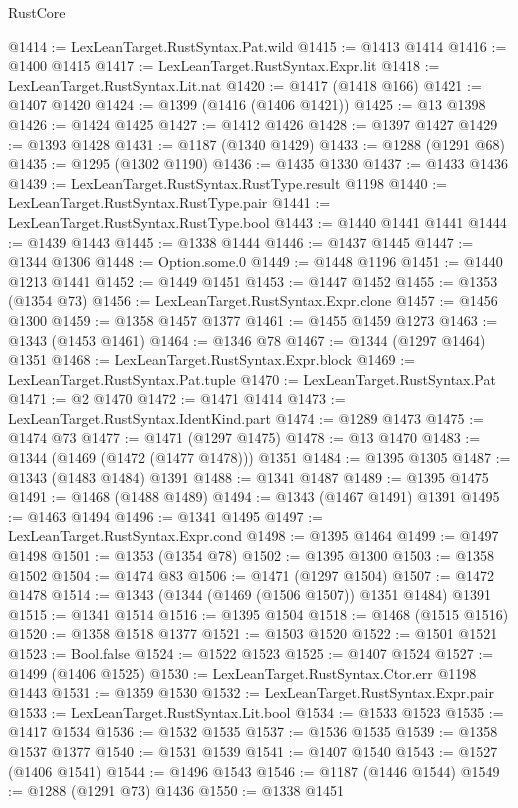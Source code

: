 \begin{lexlean}{RustCore}
\begin{coremodule}
@1414 := LexLeanTarget.RustSyntax.Pat.wild
@1415 := @1413 @1414
@1416 := @1400 @1415
@1417 := LexLeanTarget.RustSyntax.Expr.lit
@1418 := LexLeanTarget.RustSyntax.Lit.nat
@1420 := @1417 (@1418 @166)
@1421 := @1407 @1420
@1424 := @1399 (@1416 (@1406 @1421))
@1425 := @13 @1398
@1426 := @1424 @1425
@1427 := @1412 @1426
@1428 := @1397 @1427
@1429 := @1393 @1428
@1431 := @1187 (@1340 @1429)
@1433 := @1288 (@1291 @68)
@1435 := @1295 (@1302 @1190)
@1436 := @1435 @1330
@1437 := @1433 @1436
@1439 := LexLeanTarget.RustSyntax.RustType.result @1198
@1440 := LexLeanTarget.RustSyntax.RustType.pair
@1441 := LexLeanTarget.RustSyntax.RustType.bool
@1443 := @1440 @1441 @1441
@1444 := @1439 @1443
@1445 := @1338 @1444
@1446 := @1437 @1445
@1447 := @1344 @1306
@1448 := Option.some.{0}
@1449 := @1448 @1196
@1451 := @1440 @1213 @1441
@1452 := @1449 @1451
@1453 := @1447 @1452
@1455 := @1353 (@1354 @73)
@1456 := LexLeanTarget.RustSyntax.Expr.clone
@1457 := @1456 @1300
@1459 := @1358 @1457 @1377
@1461 := @1455 @1459 @1273
@1463 := @1343 (@1453 @1461)
@1464 := @1346 @78
@1467 := @1344 (@1297 @1464) @1351
@1468 := LexLeanTarget.RustSyntax.Expr.block
@1469 := LexLeanTarget.RustSyntax.Pat.tuple
@1470 := LexLeanTarget.RustSyntax.Pat
@1471 := @2 @1470
@1472 := @1471 @1414
@1473 := LexLeanTarget.RustSyntax.IdentKind.part
@1474 := @1289 @1473
@1475 := @1474 @73
@1477 := @1471 (@1297 @1475)
@1478 := @13 @1470
@1483 := @1344 (@1469 (@1472 (@1477 @1478))) @1351
@1484 := @1395 @1305
@1487 := @1343 (@1483 @1484) @1391
@1488 := @1341 @1487
@1489 := @1395 @1475
@1491 := @1468 (@1488 @1489)
@1494 := @1343 (@1467 @1491) @1391
@1495 := @1463 @1494
@1496 := @1341 @1495
@1497 := LexLeanTarget.RustSyntax.Expr.cond
@1498 := @1395 @1464
@1499 := @1497 @1498
@1501 := @1353 (@1354 @78)
@1502 := @1395 @1300
@1503 := @1358 @1502
@1504 := @1474 @83
@1506 := @1471 (@1297 @1504)
@1507 := @1472 @1478
@1514 := @1343 (@1344 (@1469 (@1506 @1507)) @1351 @1484) @1391
@1515 := @1341 @1514
@1516 := @1395 @1504
@1518 := @1468 (@1515 @1516)
@1520 := @1358 @1518 @1377
@1521 := @1503 @1520
@1522 := @1501 @1521
@1523 := Bool.false
@1524 := @1522 @1523
@1525 := @1407 @1524
@1527 := @1499 (@1406 @1525)
@1530 := LexLeanTarget.RustSyntax.Ctor.err @1198 @1443
@1531 := @1359 @1530
@1532 := LexLeanTarget.RustSyntax.Expr.pair
@1533 := LexLeanTarget.RustSyntax.Lit.bool
@1534 := @1533 @1523
@1535 := @1417 @1534
@1536 := @1532 @1535
@1537 := @1536 @1535
@1539 := @1358 @1537 @1377
@1540 := @1531 @1539
@1541 := @1407 @1540
@1543 := @1527 (@1406 @1541)
@1544 := @1496 @1543
@1546 := @1187 (@1446 @1544)
@1549 := @1288 (@1291 @73) @1436
@1550 := @1338 @1451

\end{coremodule}
\end{lexlean}

